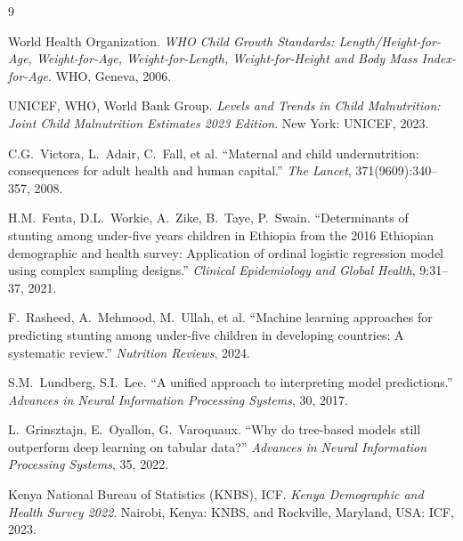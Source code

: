 \documentclass[12pt, a4paper]{article}
\begin{document}
\begin{thebibliography}{9}

World Health Organization.
\textit{WHO Child Growth Standards: Length/Height-for-Age, Weight-for-Age, Weight-for-Length, Weight-for-Height and Body Mass Index-for-Age}.
WHO, Geneva, 2006.

UNICEF, WHO, World Bank Group.
\textit{Levels and Trends in Child Malnutrition: Joint Child Malnutrition Estimates 2023 Edition}.
New York: UNICEF, 2023.

C.G.~Victora, L.~Adair, C.~Fall, et al.
``Maternal and child undernutrition: consequences for adult health and human capital.''
\textit{The Lancet}, 371(9609):340--357, 2008.

H.M.~Fenta, D.L.~Workie, A.~Zike, B.~Taye, P.~Swain.
``Determinants of stunting among under-five years children in Ethiopia from the 2016 Ethiopian demographic and health survey: Application of ordinal logistic regression model using complex sampling designs.''
\textit{Clinical Epidemiology and Global Health}, 9:31--37, 2021.

F.~Rasheed, A.~Mehmood, M.~Ullah, et al.
``Machine learning approaches for predicting stunting among under-five children in developing countries: A systematic review.''
\textit{Nutrition Reviews}, 2024.

S.M.~Lundberg, S.I.~Lee.
``A unified approach to interpreting model predictions.''
\textit{Advances in Neural Information Processing Systems}, 30, 2017.

L.~Grinsztajn, E.~Oyallon, G.~Varoquaux.
``Why do tree-based models still outperform deep learning on tabular data?''
\textit{Advances in Neural Information Processing Systems}, 35, 2022.

Kenya National Bureau of Statistics (KNBS), ICF.
\textit{Kenya Demographic and Health Survey 2022}.
Nairobi, Kenya: KNBS, and Rockville, Maryland, USA: ICF, 2023.

\end{thebibliography}
\end{document}
